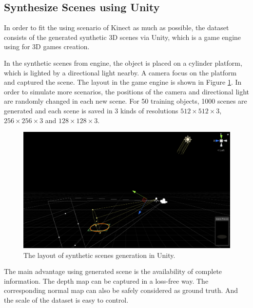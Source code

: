 \subsection{Synthesize Scenes using Unity}
In order to fit the using scenario of Kinect as much as possible, the dataset consists of the generated synthetic 3D scenes via Unity, which is a game engine using for 3D games creation. 

In the synthetic scenes from engine, the object is placed on a cylinder platform, which is lighted by a directional light nearby. A camera focus on the platform and captured the scene. The layout in the game engine is shown in Figure \ref{fig:unity-workplace}. In order to simulate more scenarios, the positions of the camera and directional light are randomly changed in each new scene. For 50 training objects, 1000 scenes are generated and each scene is saved in 3 kinds of resolutions $ 512\times512\times3 $, $ 256\times256\times3 $ and $ 128\times128\times3 $.

\begin{figure}[h!]
	\centering
	\includegraphics[width=.8\textwidth]{./Figures/unity-workplace.PNG}
	\caption{The layout of synthetic scenes generation in Unity.}
	\label{fig:unity-workplace}
\end{figure}

The main advantage using generated scene is the availability of complete information. The depth map can be captured in a loss-free way. The corresponding normal map can also be safely considered as ground truth. And the scale of the dataset is easy to control.

